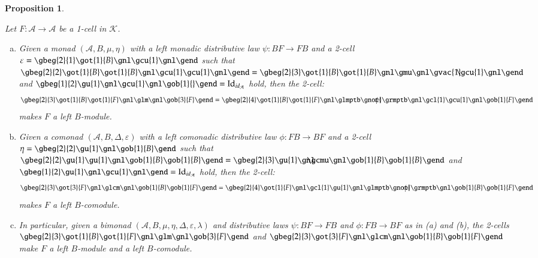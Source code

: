 \documentclass[a4paper, 12pt]{article}
\renewcommand{\_}[1]{\mbox{$_{\left( #1 \right)}$}}
\theoremstyle{plain}
\newtheorem{prop}[thm]{Proposition}
\newcommand{\A}{{\mathcal A}}
\newcommand{\Id}{\operatorname {Id}}
\newcommand{\Epsilon}{\varepsilon}
\def\K{{\mathcal K}}  %
\newcommand{\eqlabel}[1]{\label{eq:#1}}
\newcommand{\equref}[1]{(\ref{eq:#1})}
\newcommand{\prlabel}[1]{\label{pr:#1}}
\begin{document}
\begin{prop}  \prlabel{distr-actions}

Let $F:\A\to\A$ be a 1-cell in $\K$.
\begin{enumerate}[(a)]
\item
Given a monad  $(\A, B, \mu, \eta)$ with a left monadic distributive law $\psi:BF\to FB$ and a 2-cell
$\Epsilon=
\gbeg{2}{1}
\got{1}{B} \gnl
\gcu{1} \gnl
\gend$ such that
$\gbeg{2}{2}
\got{1}{B} \got{1}{B} \gnl
\gcu{1}  \gcu{1} \gnl
\gend=
\gbeg{2}{3}
\got{1}{B} \got{1}{B} \gnl
\gmu \gnl
\gvac{1} \hspace{-0,2cm} \gcu{1} \gnl
\gend$ and
$\gbeg{1}{2}
\gu{1} \gnl
\gcu{1} \gnl
\gob{1}{}
\gend=
\Id_{id_{\A}}$
hold, then the 2-cell:
\begin{equation*} %
\gbeg{2}{3}
\got{1}{B} \got{1}{F} \gnl
\glm \gnl
\gob{3}{F}
\gend=
\gbeg{2}{4}
\got{1}{B} \got{1}{F} \gnl
\glmptb \gnot{\hspace{-0,34cm}\psi} \grmptb \gnl
\gcl{1} \gcu{1} \gnl
\gob{1}{F}
\gend
\end{equation*}
makes $F$ a left $B$-module.
\item
Given a comonad $(\A, B, \Delta, \Epsilon)$ with a left comonadic distributive law $\phi:FB\to BF$ and a 2-cell
$\eta=
\gbeg{2}{2}
\gu{1} \gnl
\gob{1}{B}
\gend$ such that
$\gbeg{2}{2}
\gu{1} \gu{1} \gnl
\gob{1}{B} \gob{1}{B}
\gend=
\gbeg{2}{3}
\gu{1} \gnl
\hspace{-0,34cm} \gcmu \gnl
\gob{1}{B} \gob{1}{B}
\gend$
and
$\gbeg{1}{2}
\gu{1} \gnl
\gcu{1} \gnl
\gend=
\Id_{id_{\A}}$ hold, then the 2-cell:
\begin{equation*} %
\gbeg{2}{3}
\got{3}{F} \gnl
\glcm \gnl
\gob{1}{B} \gob{1}{F}
\gend=
\gbeg{2}{4}
\got{1}{F} \gnl
\gcl{1} \gu{1} \gnl
\glmptb \gnot{\hspace{-0,34cm}\phi} \grmptb \gnl
\gob{1}{B} \gob{1}{F}
\gend
\end{equation*}
makes $F$ a left $B$-comodule.
\item In particular, given a bimonad $(\A, B, \mu, \eta, \Delta, \Epsilon, \lambda)$ and distributive laws $\psi:BF\to FB$ and $\phi:FB\to BF$ as in (a) and (b), the 2-cells
$\gbeg{2}{3}
\got{1}{B} \got{1}{F} \gnl
\glm \gnl
\gob{3}{F}
\gend$ and 
$\gbeg{2}{3}
\got{3}{F} \gnl
\glcm \gnl
\gob{1}{B} \gob{1}{F}
\gend$ \hspace{0,2cm} 
make $F$ a left $B$-module and a left $B$-comodule.
\end{enumerate}
\end{prop}
\end{document}

